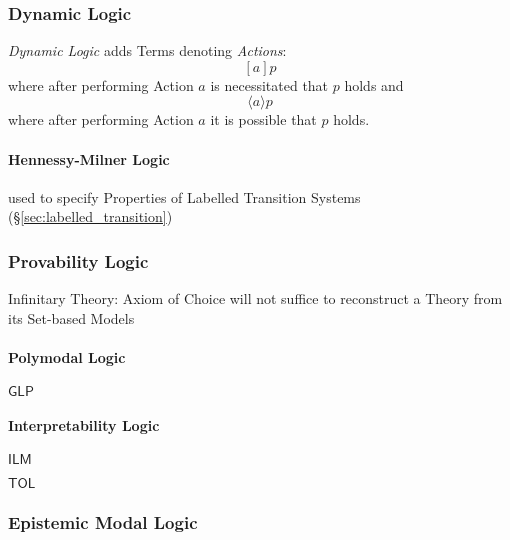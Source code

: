 \subsubsection{Dynamic Logic}\label{sec:dynamic_logic}

\emph{Dynamic Logic} adds Terms denoting \emph{Actions}:
\[
  [a]p
\]
where after performing Action $a$ is necessitated that $p$ holds and
\[
  \langle a \rangle p
\]
where after performing Action $a$ it is possible that $p$ holds.



\paragraph{Hennessy-Milner Logic}\label{sec:hennessy_milner_logic}
\hfill

used to specify Properties of Labelled Transition Systems
(\S\ref{sec:labelled_transition})



\subsubsection{Provability Logic}\label{sec:provability_logic}

Infinitary Theory: Axiom of Choice will not suffice to reconstruct a
Theory from its Set-based Models



\paragraph{Polymodal Logic}\label{sec:polymodal_logic}\hfill

$\mathsf{GLP}$



\paragraph{Interpretability Logic}\label{sec:interpretability_logic}\hfill

$\mathsf{ILM}$

$\mathsf{TOL}$



\subsubsection{Epistemic Modal Logic}\label{sec:epistemic_logic}

